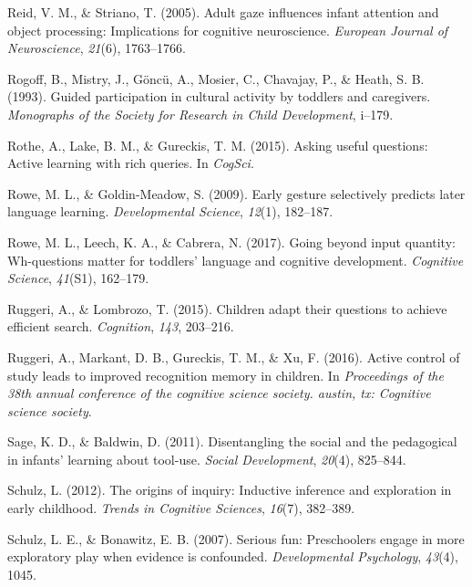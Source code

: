 \documentclass[english,man]{apa6}
\theoremstyle{definition}
\theoremstyle{definition}
\theoremstyle{definition}
\theoremstyle{remark}
\begin{document}
\hypertarget{ref-reid2005adult}{}
Reid, V. M., \& Striano, T. (2005). Adult gaze influences infant
attention and object processing: Implications for cognitive
neuroscience. \emph{European Journal of Neuroscience}, \emph{21}(6),
1763--1766.

\hypertarget{ref-rogoff1993guided}{}
Rogoff, B., Mistry, J., Göncü, A., Mosier, C., Chavajay, P., \& Heath,
S. B. (1993). Guided participation in cultural activity by toddlers and
caregivers. \emph{Monographs of the Society for Research in Child
Development}, i--179.

\hypertarget{ref-rothe2015asking}{}
Rothe, A., Lake, B. M., \& Gureckis, T. M. (2015). Asking useful
questions: Active learning with rich queries. In \emph{CogSci}.

\hypertarget{ref-rowe2009early}{}
Rowe, M. L., \& Goldin-Meadow, S. (2009). Early gesture selectively
predicts later language learning. \emph{Developmental Science},
\emph{12}(1), 182--187.

\hypertarget{ref-rowe2017going}{}
Rowe, M. L., Leech, K. A., \& Cabrera, N. (2017). Going beyond input
quantity: Wh-questions matter for toddlers' language and cognitive
development. \emph{Cognitive Science}, \emph{41}(S1), 162--179.

\hypertarget{ref-ruggeri2015children}{}
Ruggeri, A., \& Lombrozo, T. (2015). Children adapt their questions to
achieve efficient search. \emph{Cognition}, \emph{143}, 203--216.

\hypertarget{ref-ruggeri2016active}{}
Ruggeri, A., Markant, D. B., Gureckis, T. M., \& Xu, F. (2016). Active
control of study leads to improved recognition memory in children. In
\emph{Proceedings of the 38th annual conference of the cognitive science
society. austin, tx: Cognitive science society}.

\hypertarget{ref-sage2011disentangling}{}
Sage, K. D., \& Baldwin, D. (2011). Disentangling the social and the
pedagogical in infants' learning about tool-use. \emph{Social
Development}, \emph{20}(4), 825--844.

\hypertarget{ref-schulz2012origins}{}
Schulz, L. (2012). The origins of inquiry: Inductive inference and
exploration in early childhood. \emph{Trends in Cognitive Sciences},
\emph{16}(7), 382--389.

\hypertarget{ref-schulz2007serious}{}
Schulz, L. E., \& Bonawitz, E. B. (2007). Serious fun: Preschoolers
engage in more exploratory play when evidence is confounded.
\emph{Developmental Psychology}, \emph{43}(4), 1045.
\end{document}
